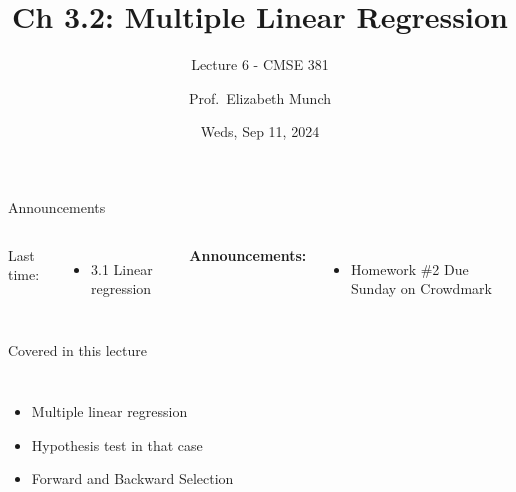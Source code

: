 \documentclass[aspectratio=169,usenames,dvipsnames]{beamer}
\begin{document}
\title[]{Ch 3.2: Multiple Linear Regression}
\subtitle{Lecture 6 - CMSE 381}
\date{Weds, Sep 11, 2024}



\author[Dr.~Munch]{Prof.~Elizabeth Munch}

\begin{frame}
 \titlepage


\end{frame}
\begin{frame}[c]{Announcements}

\begin{columns}
\centering

	Last time:
	\begin{itemize}
		\item 3.1 Linear regression
	\end{itemize}
\centering

\textbf{Announcements:}
	\begin{itemize}
		\item Homework \#2 Due Sunday on Crowdmark
	\end{itemize}
\end{columns}

\end{frame}
\begin{frame}[c]{Covered in this lecture }

\begin{columns}
\centering
\begin{itemize}
	\item Multiple linear regression
	\item Hypothesis test in that case
	\item Forward and Backward Selection
\end{itemize}
\centering

\end{columns}

\end{frame}
\end{document}
